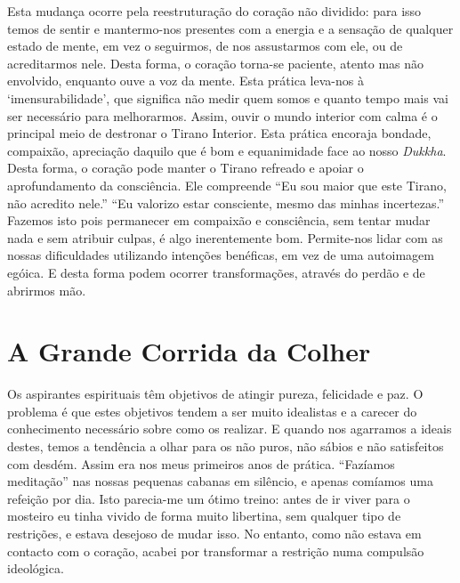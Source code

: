 Esta mudança ocorre pela reestruturação do coração não dividido: para
isso temos de sentir e mantermo-nos presentes com a energia e a sensação
de qualquer estado de mente, em vez o seguirmos, de nos assustarmos com
ele, ou de acreditarmos nele. Desta forma, o coração torna-se paciente,
atento mas não envolvido, enquanto ouve a voz da mente. Esta prática
leva-nos à `imensurabilidade', que significa não medir quem somos e
quanto tempo mais vai ser necessário para melhorarmos. Assim, ouvir o
mundo interior com calma é o principal meio de destronar o Tirano
Interior. Esta prática encoraja bondade, compaixão, apreciação daquilo
que é bom e equanimidade face ao nosso \emph{Dukkha}. Desta forma, o
coração pode manter o Tirano refreado e apoiar o aprofundamento da
consciência. Ele compreende “Eu sou maior que este Tirano, não acredito
nele.” “Eu valorizo estar consciente, mesmo das minhas incertezas.”
Fazemos isto pois permanecer em compaixão e consciência, sem tentar
mudar nada e sem atribuir culpas, é algo inerentemente bom. Permite-nos
lidar com as nossas dificuldades utilizando intenções benéficas, em vez
de uma autoimagem egóica. E desta forma podem ocorrer transformações,
através do perdão e de abrirmos mão.

\section{A Grande Corrida da Colher}

Os aspirantes espirituais têm objetivos de atingir pureza, felicidade e
paz. O problema é que estes objetivos tendem a ser muito idealistas e a
carecer do conhecimento necessário sobre como os realizar. E quando nos
agarramos a ideais destes, temos a tendência a olhar para os não puros,
não sábios e não satisfeitos com desdém. Assim era nos meus primeiros
anos de prática. “Fazíamos meditação” nas nossas pequenas cabanas em
silêncio, e apenas comíamos uma refeição por dia. Isto parecia-me um
ótimo treino: antes de ir viver para o mosteiro eu tinha vivido de forma
muito libertina, sem qualquer tipo de restrições, e estava desejoso de
mudar isso. No entanto, como não estava em contacto com o coração,
acabei por transformar a restrição numa compulsão ideológica.

